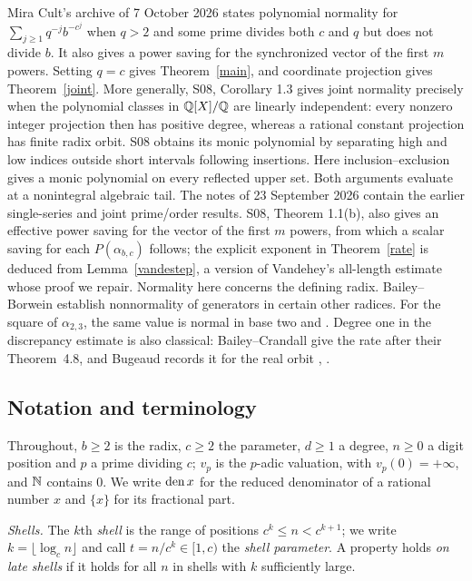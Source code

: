 \documentclass[11pt]{article}
\begin{document}
Mira Cult's archive of 7 October 2026 \cite[S08, Thm.~1.1 and Cors.~1.2--1.3]{mira2} states polynomial
normality for \(\sum_{j\ge1}q^{-j}b^{-c^j}\) when \(q>2\) and some prime
divides both \(c\) and \(q\) but does not divide \(b\). It also gives a
power saving for the synchronized vector of the first \(m\) powers.
Setting \(q=c\) gives Theorem~\ref{main}, and coordinate projection gives
Theorem~\ref{joint}. More generally, S08, Corollary 1.3 gives joint
normality precisely when the polynomial classes in \(\mathbb Q[X]/\mathbb Q\) are
linearly independent: every nonzero integer projection then has positive
degree, whereas a rational constant projection has finite radix orbit. S08 obtains its monic polynomial by separating high
and low indices outside short intervals following insertions. Here
inclusion--exclusion gives a monic polynomial on every reflected upper set.
Both arguments evaluate at a nonintegral algebraic tail. The notes
of 23 September 2026 \cite[S07, S09]{mira} contain the earlier
single-series and joint prime/order results. S08, Theorem 1.1(b), also
gives an effective power saving for the vector of the first \(m\) powers,
from which a scalar saving for each \(P(\alpha_{b,c})\) follows; the
explicit exponent in Theorem~\ref{rate} is deduced from Lemma~\ref{vandestep},
a version of Vandehey's all-length estimate \cite{vandehey} whose proof we
repair. Normality here
concerns the defining radix. Bailey--Borwein \cite[Thm.~2]{bb}
establish nonnormality of generators in certain other radices. For the
square of \(\alpha_{2,3}\), the same value is normal in base two and
. Degree one in the
discrepancy estimate is also classical: Bailey--Crandall give the rate
after their Theorem~4.8, and Bugeaud records it for the real orbit
\cite[p.~535]{bc}, \cite[\S5.1]{bugeaud}.

\subsection{Notation and terminology}\label{notation}
Throughout, \(b\ge2\) is the radix, \(c\ge2\) the parameter, \(d\ge1\) a
degree, \(n\ge0\) a digit position and \(p\) a prime dividing \(c\);
\(v_p\) is the \(p\)-adic valuation, with \(v_p(0)=+\infty\), and \(\mathbb N\)
contains \(0\). We write \(\operatorname{den} x\) for the reduced denominator of a
rational number \(x\) and \(\{x\}\) for its fractional part.

\emph{Shells.} The \(k\)th \emph{shell} is the range of positions
\(c^k\le n<c^{k+1}\); we write \(k=\lfloor\log_c n\rfloor\) and call
\(t=n/c^k\in[1,c)\) the \emph{shell parameter}. A property holds
\emph{on late shells} if it holds for all \(n\) in shells with \(k\)
sufficiently large.
\end{document}
